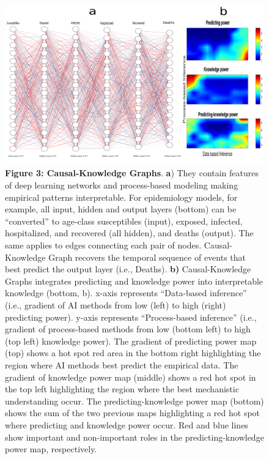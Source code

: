 \documentclass[11pt, a4paper]{article} %
\begin{document}
 \begin{figure}[h!]
   \includegraphics[width=1\textwidth]{Figures/Figure3integrated.pdf}
   {\small {\bf Figure 3: Causal-Knowledge Graphs}. {\bf a}) They
     contain features of deep learning networks and process-based
     modeling making empirical patterns interpretable. For
     epidemiology models, for example, all input, hidden and output
     layers (bottom) can be ``converted'' to age-class susceptibles
     (input), exposed, infected, hospitalized, and recovered (all
     hidden), and deaths (output). The same applies to edges
     connecting each pair of nodes. Causal-Knowledge Graph recovers
     the temporal sequence of events that best predict the output
     layer (i.e., Deaths). {\bf b)} Causal-Knowledge Graphs integrates
     predicting and knowledge power into interpretable knowledge
     (bottom, b). x-axis represents ``Data-based inference'' (i.e.,
     gradient of AI methods from low (left) to high (right) predicting
     power). y-axis represents ``Process-based inference'' (i.e.,
     gradient of process-based methods from low (bottom left) to high
     (top left) knowledge power). The gradient of predicting power map
     (top) shows a hot spot red area in the bottom right highlighting
     the region where AI methods best predict the empirical data. The
     gradient of knowledge power map (middle) shows a red hot spot in
     the top left highlighting the region where the best mechanistic
     understanding occur. The predicting-knowledge power map (bottom)
     shows the sum of the two previous maps highlighting a red hot
     spot where predicting and knowledge power occur. Red and blue
     lines show important and non-important roles in the
     predicting-knowledge power map, respectively.}
\end{figure}
\end{document}
